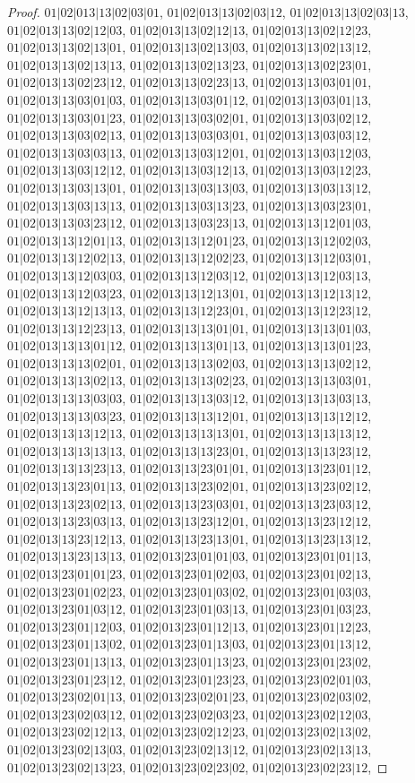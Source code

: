 \documentclass[12pt]{article}
\theoremstyle{plain}
\theoremstyle{definition}
\theoremstyle{remark}
\begin{document}
\begin{proof}
$01|02|013|13|02|03|01$, $01|02|013|13|02|03|12$, $01|02|013|13|02|03|13$, $01|02|013|13|02|12|03$, $01|02|013|13|02|12|13$, $01|02|013|13|02|12|23$, $01|02|013|13|02|13|01$, $01|02|013|13|02|13|03$, $01|02|013|13|02|13|12$, $01|02|013|13|02|13|13$, $01|02|013|13|02|13|23$, $01|02|013|13|02|23|01$, $01|02|013|13|02|23|12$, $01|02|013|13|02|23|13$, $01|02|013|13|03|01|01$, $01|02|013|13|03|01|03$, $01|02|013|13|03|01|12$, $01|02|013|13|03|01|13$, $01|02|013|13|03|01|23$, $01|02|013|13|03|02|01$, $01|02|013|13|03|02|12$, $01|02|013|13|03|02|13$, $01|02|013|13|03|03|01$, $01|02|013|13|03|03|12$, $01|02|013|13|03|03|13$, $01|02|013|13|03|12|01$, $01|02|013|13|03|12|03$, $01|02|013|13|03|12|12$, $01|02|013|13|03|12|13$, $01|02|013|13|03|12|23$, $01|02|013|13|03|13|01$, $01|02|013|13|03|13|03$, $01|02|013|13|03|13|12$, $01|02|013|13|03|13|13$, $01|02|013|13|03|13|23$, $01|02|013|13|03|23|01$, $01|02|013|13|03|23|12$, $01|02|013|13|03|23|13$, $01|02|013|13|12|01|03$, $01|02|013|13|12|01|13$, $01|02|013|13|12|01|23$, $01|02|013|13|12|02|03$, $01|02|013|13|12|02|13$, $01|02|013|13|12|02|23$, $01|02|013|13|12|03|01$, $01|02|013|13|12|03|03$, $01|02|013|13|12|03|12$, $01|02|013|13|12|03|13$, $01|02|013|13|12|03|23$, $01|02|013|13|12|13|01$, $01|02|013|13|12|13|12$, $01|02|013|13|12|13|13$, $01|02|013|13|12|23|01$, $01|02|013|13|12|23|12$, $01|02|013|13|12|23|13$, $01|02|013|13|13|01|01$, $01|02|013|13|13|01|03$, $01|02|013|13|13|01|12$, $01|02|013|13|13|01|13$, $01|02|013|13|13|01|23$, $01|02|013|13|13|02|01$, $01|02|013|13|13|02|03$, $01|02|013|13|13|02|12$, $01|02|013|13|13|02|13$, $01|02|013|13|13|02|23$, $01|02|013|13|13|03|01$, $01|02|013|13|13|03|03$, $01|02|013|13|13|03|12$, $01|02|013|13|13|03|13$, $01|02|013|13|13|03|23$, $01|02|013|13|13|12|01$, $01|02|013|13|13|12|12$, $01|02|013|13|13|12|13$, $01|02|013|13|13|13|01$, $01|02|013|13|13|13|12$, $01|02|013|13|13|13|13$, $01|02|013|13|13|23|01$, $01|02|013|13|13|23|12$, $01|02|013|13|13|23|13$, $01|02|013|13|23|01|01$, $01|02|013|13|23|01|12$, $01|02|013|13|23|01|13$, $01|02|013|13|23|02|01$, $01|02|013|13|23|02|12$, $01|02|013|13|23|02|13$, $01|02|013|13|23|03|01$, $01|02|013|13|23|03|12$, $01|02|013|13|23|03|13$, $01|02|013|13|23|12|01$, $01|02|013|13|23|12|12$, $01|02|013|13|23|12|13$, $01|02|013|13|23|13|01$, $01|02|013|13|23|13|12$, $01|02|013|13|23|13|13$, $01|02|013|23|01|01|03$, $01|02|013|23|01|01|13$, $01|02|013|23|01|01|23$, $01|02|013|23|01|02|03$, $01|02|013|23|01|02|13$, $01|02|013|23|01|02|23$, $01|02|013|23|01|03|02$, $01|02|013|23|01|03|03$, $01|02|013|23|01|03|12$, $01|02|013|23|01|03|13$, $01|02|013|23|01|03|23$, $01|02|013|23|01|12|03$, $01|02|013|23|01|12|13$, $01|02|013|23|01|12|23$, $01|02|013|23|01|13|02$, $01|02|013|23|01|13|03$, $01|02|013|23|01|13|12$, $01|02|013|23|01|13|13$, $01|02|013|23|01|13|23$, $01|02|013|23|01|23|02$, $01|02|013|23|01|23|12$, $01|02|013|23|01|23|23$, $01|02|013|23|02|01|03$, $01|02|013|23|02|01|13$, $01|02|013|23|02|01|23$, $01|02|013|23|02|03|02$, $01|02|013|23|02|03|12$, $01|02|013|23|02|03|23$, $01|02|013|23|02|12|03$, $01|02|013|23|02|12|13$, $01|02|013|23|02|12|23$, $01|02|013|23|02|13|02$, $01|02|013|23|02|13|03$, $01|02|013|23|02|13|12$, $01|02|013|23|02|13|13$, $01|02|013|23|02|13|23$, $01|02|013|23|02|23|02$, $01|02|013|23|02|23|12$, 
\end{proof}
\end{document}
